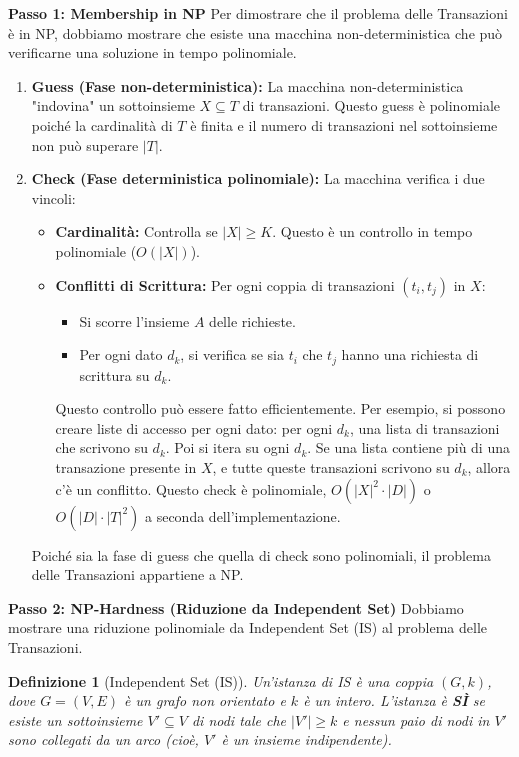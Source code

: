 \documentclass[a4paper, 11pt]{book} %
\newtheorem{definition}[theorem]{Definizione}
\theoremstyle{definition}
\begin{document}
\textbf{Passo 1: Membership in NP}
Per dimostrare che il problema delle Transazioni è in NP, dobbiamo mostrare che esiste una macchina non-deterministica che può verificarne una soluzione in tempo polinomiale.
\begin{enumerate}
    \item \textbf{Guess (Fase non-deterministica):} La macchina non-deterministica "indovina" un sottoinsieme $X \subseteq T$ di transazioni. Questo guess è polinomiale poiché la cardinalità di $T$ è finita e il numero di transazioni nel sottoinsieme non può superare $|T|$.
    \item \textbf{Check (Fase deterministica polinomiale):} La macchina verifica i due vincoli:
    \begin{itemize}
        \item \textbf{Cardinalità:} Controlla se $|X| \ge K$. Questo è un controllo in tempo polinomiale ($O(|X|)$).
        \item \textbf{Conflitti di Scrittura:} Per ogni coppia di transazioni $(t_i, t_j)$ in $X$:
        \begin{itemize}
            \item Si scorre l'insieme $A$ delle richieste.
            \item Per ogni dato $d_k$, si verifica se sia $t_i$ che $t_j$ hanno una richiesta di scrittura su $d_k$.
        \end{itemize}
        Questo controllo può essere fatto efficientemente. Per esempio, si possono creare liste di accesso per ogni dato: per ogni $d_k$, una lista di transazioni che scrivono su $d_k$. Poi si itera su ogni $d_k$. Se una lista contiene più di una transazione presente in $X$, e tutte queste transazioni scrivono su $d_k$, allora c'è un conflitto. Questo check è polinomiale, $O(|X|^2 \cdot |D|)$ o $O(|D| \cdot |T|^2)$ a seconda dell'implementazione.
    \end{itemize}
    Poiché sia la fase di guess che quella di check sono polinomiali, il problema delle Transazioni appartiene a NP.
\end{enumerate}

\textbf{Passo 2: NP-Hardness (Riduzione da Independent Set)}
Dobbiamo mostrare una riduzione polinomiale da Independent Set (IS) al problema delle Transazioni.
\begin{definition}[Independent Set (IS)]
Un'istanza di IS è una coppia $(G, k)$, dove $G=(V, E)$ è un grafo non orientato e $k$ è un intero. L'istanza è \textbf{SÌ} se esiste un sottoinsieme $V' \subseteq V$ di nodi tale che $|V'| \ge k$ e nessun paio di nodi in $V'$ sono collegati da un arco (cioè, $V'$ è un insieme indipendente).
\end{definition}
\end{document}
